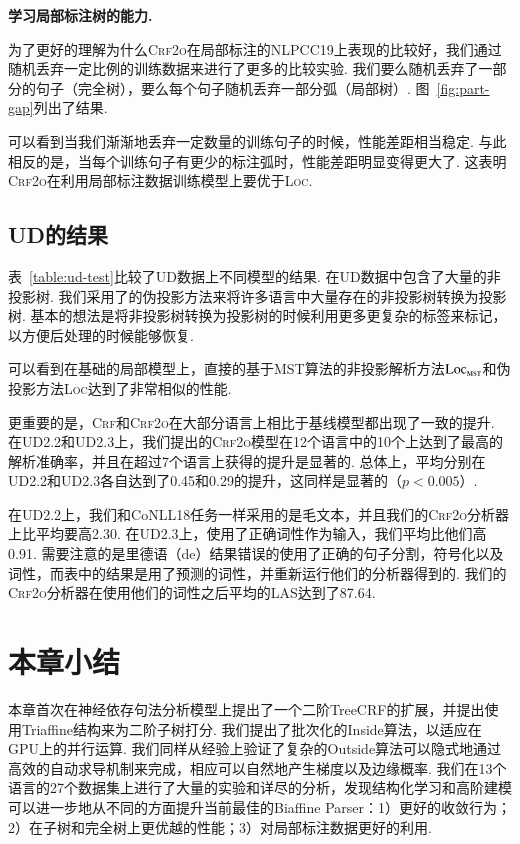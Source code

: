 \noindent\textbf{学习局部标注树的能力.}

为了更好的理解为什么\textsc{Crf2o}在局部标注的NLPCC19上表现的比较好，我们通过随机丢弃一定比例的训练数据来进行了更多的比较实验.
我们要么随机丢弃了一部分的句子（完全树），要么每个句子随机丢弃一部分弧（局部树）.
图~\ref{fig:part-gap}列出了结果.

可以看到当我们渐渐地丢弃一定数量的训练句子的时候，性能差距相当稳定.
与此相反的是，当每个训练句子有更少的标注弧时，性能差距明显变得更大了.
这表明\textsc{Crf2o}在利用局部标注数据训练模型上要优于\textsc{Loc}.



\subsection{UD的结果}

表~\ref{table:ud-test}比较了UD数据上不同模型的结果.
在UD数据中包含了大量的非投影树.
我们采用了\cite{nivre-nilsson-2005-pseudo}的伪投影方法来将许多语言中大量存在的非投影树转换为投影树.
基本的想法是将非投影树转换为投影树的时候利用更多更复杂的标签来标记，以方便后处理的时候能够恢复.

可以看到在基础的局部模型上，直接的基于MST算法的非投影解析方法$\textsc{Loc}_{\textsc{mst}}$和伪投影方法\textsc{Loc}达到了非常相似的性能.

更重要的是，\textsc{Crf}和\textsc{Crf2o}在大部分语言上相比于基线模型都出现了一致的提升.
在UD2.2和UD2.3上，我们提出的\textsc{Crf2o}模型在12个语言中的10个上达到了最高的解析准确率，并且在超过7个语言上获得的提升是显著的.
总体上，平均分别在UD2.2和UD2.3各自达到了0.45和0.29的提升，这同样是显著的（$p<0.005$）.

在UD2.2上，我们和CoNLL18任务一样采用的是毛文本，并且我们的\textsc{Crf2o}分析器上比\cite{ji-etal-2019-graph}平均要高2.30.
在UD2.3上，\cite{zhang-etal-2019-empirical}使用了正确词性作为输入，我们平均比他们高0.91.
需要注意的是\cite{ji-etal-2019-graph}里德语（de）结果错误的使用了正确的句子分割，符号化以及词性，而表中的结果是用了预测的词性，并重新运行他们的分析器得到的.
我们的\textsc{Crf2o}分析器在使用他们的词性之后平均的LAS达到了87.64.

\section{本章小结}
\label{sec:dep-conclusions}

本章首次在神经依存句法分析模型上提出了一个二阶TreeCRF的扩展，并提出使用Triaffine结构来为二阶子树打分.
我们提出了批次化的Inside算法，以适应在GPU上的并行运算.
我们同样从经验上验证了复杂的Outside算法可以隐式地通过高效的自动求导机制来完成，相应可以自然地产生梯度以及边缘概率.
我们在13个语言的27个数据集上进行了大量的实验和详尽的分析，发现结构化学习和高阶建模可以进一步地从不同的方面提升当前最佳的Biaffine Parser：1）更好的收敛行为；2）在子树和完全树上更优越的性能；3）对局部标注数据更好的利用.
